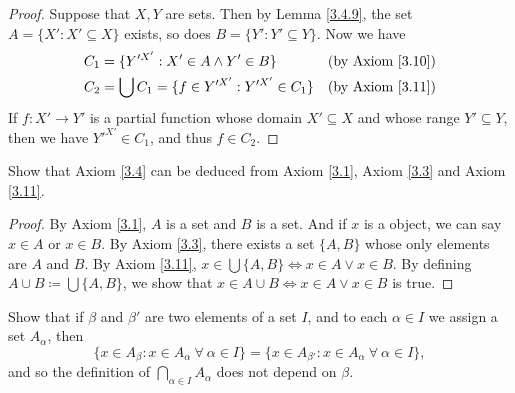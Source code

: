 \begin{proof}
    Suppose that \(X, Y\) are sets.
    Then by Lemma \ref{3.4.9}, the set \(A = \{X' : X' \subseteq X\}\) exists, so does \(B = \{Y' : Y' \subseteq Y\}\).
    Now we have
    \begin{align*}
        C_1 & = \{Y'^{X'} : X' \in A \land Y' \in B\}             & \text{(by Axiom \ref{3.10})} \\
        C_2 & = \bigcup C_1 = \{f \in Y'^{X'} : Y'^{X'} \in C_1\} & \text{(by Axiom \ref{3.11})} \\
    \end{align*}
    If \(f : X' \to Y'\) is a partial function whose domain \(X' \subseteq X\) and whose range \(Y' \subseteq Y\), then we have \(Y'^{X'} \in C_1\), and thus \(f \in C_2\).
\end{proof}

\begin{exercise}\label{ex 3.4.8}
    Show that Axiom \ref{3.4} can be deduced from Axiom \ref{3.1}, Axiom \ref{3.3} and Axiom \ref{3.11}.
\end{exercise}

\begin{proof}
    By Axiom \ref{3.1}, \(A\) is a set and \(B\) is a set.
    And if \(x\) is a object, we can say \(x \in A\) or \(x \in B\).
    By Axiom \ref{3.3}, there exists a set \(\{A, B\}\) whose only elements are \(A\) and \(B\).
    By Axiom \ref{3.11}, \(x \in \bigcup \{A, B\} \iff x \in A \lor x \in B\).
    By defining \(A \cup B \coloneqq \bigcup \{A, B\}\), we show that \(x \in A \cup B \iff x \in A \lor x \in B\) is true.
\end{proof}

\begin{exercise}\label{ex 3.4.9}
    Show that if \(\beta\) and \(\beta'\) are two elements of a set \(I\), and to each \(\alpha \in I\) we assign a set \(A_{\alpha}\), then
    \[
        \{x \in A_{\beta} : x \in A_{\alpha} \ \forall\ \alpha \in I\} = \{x \in A_{\beta'} : x \in A_{\alpha} \ \forall\ \alpha \in I\},
    \]
    and so the definition of \(\bigcap_{\alpha \in I} A_{\alpha}\) does not depend on \(\beta\).
\end{exercise}

